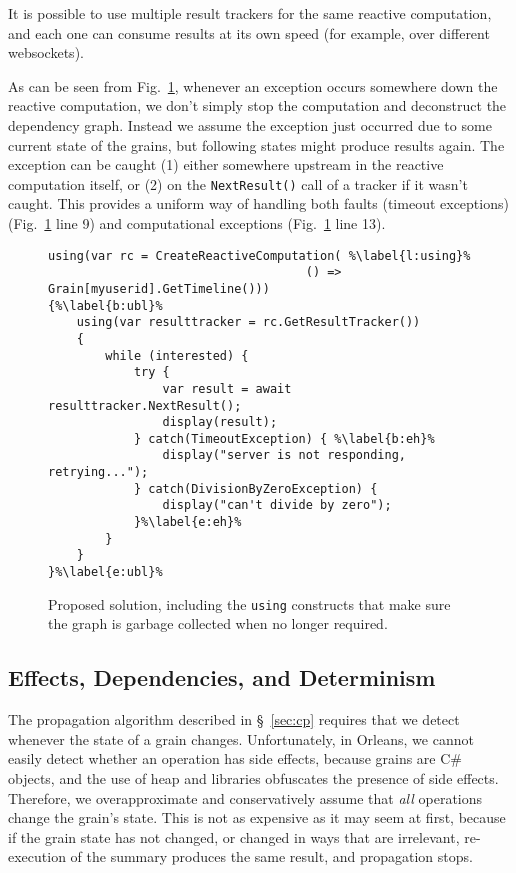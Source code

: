 It is possible to use multiple result trackers for the same reactive computation, and each one can consume results at its own speed (for example, over different websockets).

As can be seen from Fig.~\ref{fig:impl}, whenever an exception occurs somewhere down the reactive computation, we don't simply stop the computation and deconstruct the dependency graph. Instead we assume the exception just occurred due to some current state of the grains, but following states might produce results again. The exception can be caught (1) either somewhere upstream in the reactive computation itself, or (2) on the \lstinline|NextResult()| call of a tracker if it wasn't caught. This provides a uniform way of handling both faults (timeout exceptions) (Fig.~\ref{fig:impl} line 9) and computational exceptions (Fig.~\ref{fig:impl} line 13).


\begin{figure}
\begin{lstlisting}
using(var rc = CreateReactiveComputation( %\label{l:using}%
									() => Grain[myuserid].GetTimeline())) 
{%\label{b:ubl}%
	using(var resulttracker = rc.GetResultTracker()) 
	{
		while (interested) {
			try {
				var result = await resulttracker.NextResult();
				display(result);
			} catch(TimeoutException) { %\label{b:eh}%
				display("server is not responding, retrying...");
			} catch(DivisionByZeroException) {
				display("can't divide by zero");			
			}%\label{e:eh}%
		}
	}
}%\label{e:ubl}%
\end{lstlisting}
\caption{Proposed solution, including the \texttt{using} constructs that make sure the graph is garbage collected when no longer required.}\label{fig:impl}
\end{figure}
\subsection{Effects, Dependencies, and Determinism}

 The propagation algorithm described in \S~\ref{sec:cp} requires that we detect whenever the state of a grain changes. Unfortunately, in Orleans, we cannot easily detect whether an operation has side effects, because grains are C\# objects, and the use of heap and libraries obfuscates the presence of side effects. Therefore, we overapproximate and conservatively assume that \emph{all} operations change the grain's state. This is not as expensive as it may seem at first, because if the grain state has not changed, or changed in ways that are irrelevant, re-execution of the summary produces the same result, and propagation stops. 


